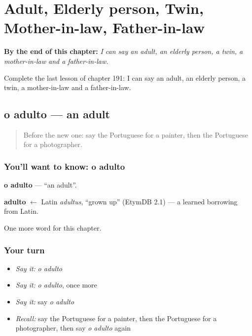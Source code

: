 
\chapter{Adult, Elderly person, Twin, Mother-in-law, Father-in-law}
\label{ch:pt-adult-elderly-person-twin-mother-in-law-father-in-law}

\begin{chapteropening}
\textbf{By the end of this chapter:} \emph{I can say an adult, an elderly person, a twin, a mother-in-law and a father-in-law.}

Complete the last lesson of chapter 191: I can say an adult, an elderly person, a twin, a mother-in-law and a father-in-law.
\end{chapteropening}

\section[o adulto]{o adulto — an adult}

\label{lesson:PT-C191-adulto}



\begin{quote}
Before the new one: say the Portuguese for a painter, then the Portuguese for a photographer.
\end{quote}

\subsection*{You'll want to know: o adulto}
\textbf{o adulto} — \textquotedblleft{}an adult\textquotedblright{}.

\begin{cousinweb}
\textbf{adulto} $\leftarrow$ Latin \emph{adultus}, \textquotedblleft{}grown up\textquotedblright{} (EtymDB 2.1) — a learned borrowing from Latin.
\end{cousinweb}

\begin{grammarlens}[title={What you've built}]
One more word for this chapter.
\end{grammarlens}

\subsection*{Your turn}
\begin{itemize}
\raggedright
  \item \emph{Say it:} \emph{o adulto}
  \item \emph{Say it:} \emph{o adulto}, once more
  \item \emph{Say it:} say \emph{o adulto}
  \item \emph{Recall:} say the Portuguese for a painter, then the Portuguese for a photographer, then say \emph{o adulto} again
\end{itemize}

